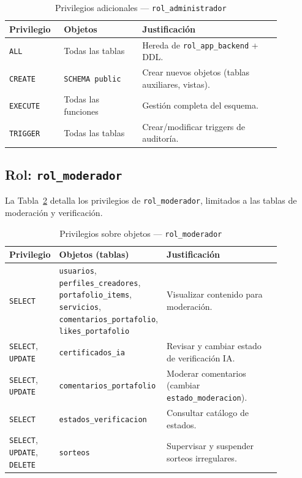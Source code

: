 \documentclass[conference, onecolumn]{IEEEtran}
\begin{document}
\begin{table}[H]
\centering
\caption{Privilegios adicionales — \texttt{rol\_administrador}}
\label{tab:priv_admin}
\scriptsize
\begin{tabular}{>{\raggedright\arraybackslash}p{0.16\linewidth} >{\raggedright\arraybackslash}p{0.26\linewidth} >{\raggedright\arraybackslash}p{0.46\linewidth}}
\toprule
\textbf{Privilegio} & \textbf{Objetos} & \textbf{Justificación} \\
\midrule
\texttt{ALL} & Todas las tablas & Hereda de \texttt{rol\_app\_backend} + DDL. \\
\texttt{CREATE} & \texttt{SCHEMA public} & Crear nuevos objetos (tablas auxiliares, vistas). \\
\texttt{EXECUTE} & Todas las funciones & Gestión completa del esquema. \\
\texttt{TRIGGER} & Todas las tablas & Crear/modificar triggers de auditoría. \\
\bottomrule
\end{tabular}
\end{table}

\subsection{Rol: \texttt{rol\_moderador}}

La Tabla~\ref{tab:priv_moderador} detalla los privilegios de \texttt{rol\_moderador}, limitados a las tablas de moderación y verificación.

\begin{table}[H]
\centering
\caption{Privilegios sobre objetos — \texttt{rol\_moderador}}
\label{tab:priv_moderador}
\scriptsize
\begin{tabular}{>{\raggedright\arraybackslash}p{0.16\linewidth} >{\raggedright\arraybackslash}p{0.30\linewidth} >{\raggedright\arraybackslash}p{0.42\linewidth}}
\toprule
\textbf{Privilegio} & \textbf{Objetos (tablas)} & \textbf{Justificación} \\
\midrule
\texttt{SELECT} & \texttt{usuarios}, \texttt{perfiles\_creadores}, \texttt{portafolio\_items}, \texttt{servicios}, \texttt{comentarios\_portafolio}, \texttt{likes\_portafolio} & Visualizar contenido para moderación. \\
\midrule
\texttt{SELECT}, \texttt{UPDATE} & \texttt{certificados\_ia} & Revisar y cambiar estado de verificación IA. \\
\midrule
\texttt{SELECT}, \texttt{UPDATE} & \texttt{comentarios\_portafolio} & Moderar comentarios (cambiar \texttt{estado\_moderacion}). \\
\midrule
\texttt{SELECT} & \texttt{estados\_verificacion} & Consultar catálogo de estados. \\
\midrule
\texttt{SELECT}, \texttt{UPDATE}, \texttt{DELETE} & \texttt{sorteos} & Supervisar y suspender sorteos irregulares. \\
\bottomrule
\end{tabular}
\end{table}
\end{document}
